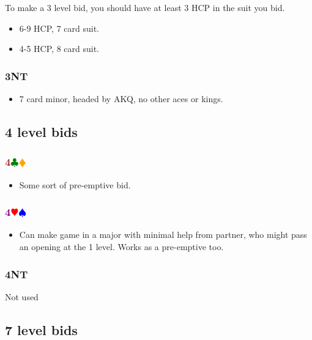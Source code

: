 \documentclass{article}
\newcommand{\Hs}{\textcolor{Red}{$\varheart$}}
\newcommand{\Ss}{\textcolor{Blue}{$\spadesuit$}}
\newcommand{\Ds}{\textcolor{Orange}{$\vardiamond$}}
\newcommand{\Cs}{\textcolor{Green}{$\clubsuit$}}
\newcommand{\NTs}{\textbf{\footnotesize{NT}}}
\newcommand{\NT}[1]{\textbf{#1\NTs}}
\newcommand{\minors}[1]{\textcolor{Brown}{\textbf{#1}}\Cs\Ds}
\newcommand{\majors}[1]{\textcolor{Purple}{\textbf{#1}}\Hs\Ss}
\begin{document}
To make a 3 level bid, you should have at least 3 HCP in the suit you bid.

\begin{itemize}
\item 6-9 HCP, 7 card suit.
\item 4-5 HCP, 8 card suit.
\end{itemize}

\subsubsection{\NT{3}}

\begin{itemize}
\item 7 card minor, headed by AKQ, no other aces or kings.
\end{itemize}

\subsection{4 level bids}

\subsubsection{\minors{4}}

\begin{itemize}
\item Some sort of pre-emptive bid.
\end{itemize}

\subsubsection{\majors{4}}

\begin{itemize}
\item Can make game in a major with minimal help from partner, who might pass an opening at the 1 level. Works as a pre-emptive too.
\end{itemize}

\subsubsection{\NT{4}}

Not used

\subsection{7 level bids}
\end{document}
